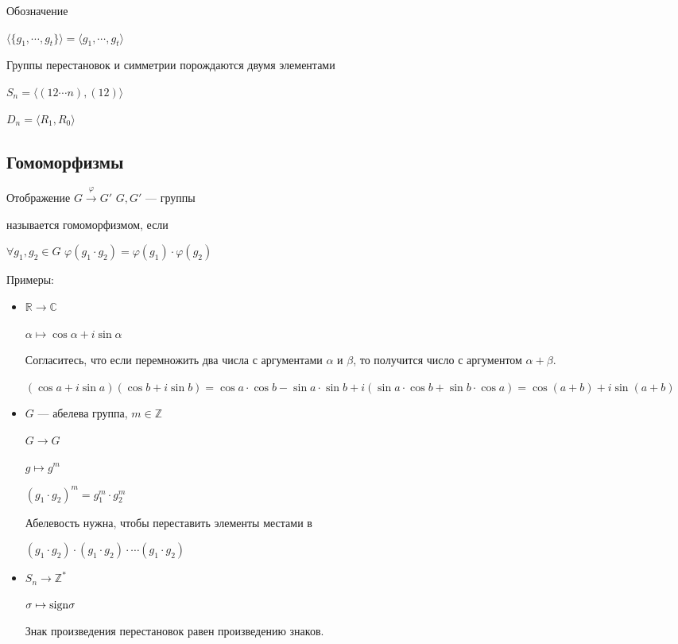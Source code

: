 \notice Обозначение

$\langle \{ g_1, \cdots, g_t \} \rangle = \langle g_1, \cdots, g_t \rangle$

\notice Группы перестановок и симметрии порождаются двумя элементами

$S_n = \langle (1 2 \cdots n), (12) \rangle$

$D_n = \langle R_1, R_0 \rangle $

\subsection{Гомоморфизмы}

\begin{conj}
  Отображение $G \stackrel{\varphi}{\longrightarrow} G'$ $G, G'$ --- группы

  называется гомоморфизмом, если 

  $\forall g_1, g_2 \in G$ $\varphi(g_1 \cdot g_2) = \varphi(g_1) \cdot \varphi(g_2)$
\end{conj}

Примеры:
\begin{itemize}
  \item $\mathbb{R} \longrightarrow \mathbb{C}$
  
  $\alpha \mapsto \cos{\alpha} + i\sin{\alpha}$

  Согласитесь, что если перемножить два числа с аргументами $\alpha$ и $\beta$, то получится число с аргументом $\alpha + \beta$.

  $(\cos{a} + i\sin{a})(\cos{b} + i\sin{b}) = \cos{a}\cdot\cos{b} - \sin{a}\cdot\sin{b} + i(\sin{a}\cdot\cos{b} + \sin{b}\cdot\cos{a}) = \cos(a + b) + i\sin(a + b)$

  \item $G$ --- абелева группа, $m\in \mathbb{Z}$
  
  $G \longrightarrow G$

  $g \mapsto g^m$

  $(g_1 \cdot g_2)^m = g_1^m \cdot g_2^m$
  
  Абелевость нужна, чтобы переставить элементы местами в 
  
  $(g_1 \cdot g_2) \cdot (g_1 \cdot g_2) \cdot \cdots (g_1 \cdot g_2)$

  \item  $S_n \longrightarrow \mathbb{Z}^*$

  $\sigma \mapsto \operatorname{sign \sigma}$

  Знак произведения перестановок равен произведению знаков.
\end{itemize}

